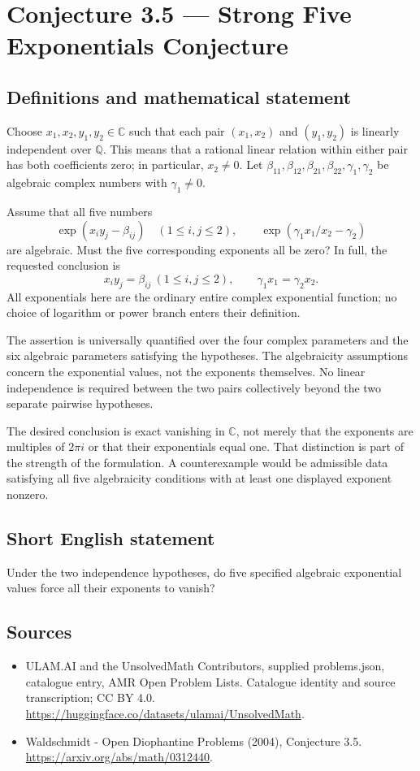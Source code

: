 \documentclass[11pt,a4paper]{article}
\begin{document}
\section*{Conjecture 3.5 — Strong Five Exponentials Conjecture}\label{statement}

\subsection{Definitions and mathematical statement}
Choose $x_1,x_2,y_1,y_2\in\mathbb C$ such that each pair $(x_1,x_2)$ and $(y_1,y_2)$ is linearly independent over $\mathbb Q$. This means that a rational linear relation within either pair has both coefficients zero; in particular, $x_2\ne0$. Let $\beta_{11},\beta_{12},\beta_{21},\beta_{22},\gamma_1,\gamma_2$ be algebraic complex numbers with $\gamma_1\ne0$.

Assume that all five numbers
\[
\exp(x_i y_j-\beta_{ij})\quad(1\le i,j\le2),
\qquad \exp(\gamma_1x_1/x_2-\gamma_2)
\]
are algebraic. Must the five corresponding exponents all be zero? In full, the requested conclusion is
\[
x_i y_j=\beta_{ij}\ (1\le i,j\le2),\qquad
\gamma_1x_1=\gamma_2x_2.
\]
All exponentials here are the ordinary entire complex exponential function; no choice of logarithm or power branch enters their definition.

The assertion is universally quantified over the four complex parameters and the six algebraic parameters satisfying the hypotheses. The algebraicity assumptions concern the exponential values, not the exponents themselves. No linear independence is required between the two pairs collectively beyond the two separate pairwise hypotheses.

The desired conclusion is exact vanishing in $\mathbb C$, not merely that the exponents are multiples of $2\pi i$ or that their exponentials equal one. That distinction is part of the strength of the formulation. A counterexample would be admissible data satisfying all five algebraicity conditions with at least one displayed exponent nonzero.
\subsection{Short English statement}
Under the two independence hypotheses, do five specified algebraic exponential values force all their exponents to vanish?
\subsection{Sources}
\begin{itemize}
\item[S1] ULAM.AI and the UnsolvedMath Contributors, supplied problems.json, catalogue entry, AMR Open Problem Lists. Catalogue identity and source transcription; CC BY 4.0.
\url{https://huggingface.co/datasets/ulamai/UnsolvedMath}.
\item[S2] Waldschmidt - Open Diophantine Problems (2004), Conjecture 3.5. 
\url{https://arxiv.org/abs/math/0312440}.
\end{itemize}
\end{document}
